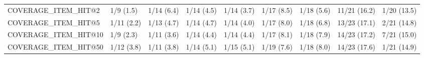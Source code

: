 \begin{tabular}{lllllllll}
COVERAGE_ITEM_HIT@2         &      1/9 (1.5) &     1/14 (6.4) &    1/14 (4.5) &    1/14 (3.7) &  1/17 (8.5) &   1/18 (5.6) &   11/21 (16.2) &        1/20 (13.5) \\
COVERAGE_ITEM_HIT@5         &     1/11 (2.2) &     1/13 (4.7) &    1/14 (4.7) &    1/14 (4.0) &  1/17 (8.0) &   1/18 (6.8) &   13/23 (17.1) &        2/21 (14.8) \\
COVERAGE_ITEM_HIT@10        &      1/9 (2.3) &     1/11 (3.6) &    1/14 (4.4) &    1/14 (4.4) &  1/17 (8.1) &   1/18 (7.9) &   14/23 (17.2) &        7/21 (15.0) \\
COVERAGE_ITEM_HIT@50        &     1/12 (3.8) &     1/11 (3.8) &    1/14 (5.1) &    1/15 (5.1) &  1/19 (7.6) &   1/18 (8.0) &   14/23 (17.6) &        1/21 (14.9) \\
\bottomrule
\end{tabular}
